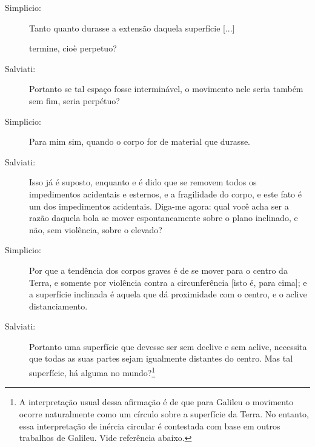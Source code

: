 \begin{description}
\item[Simplicio:] Tanto quanto durasse a extensão daquela superfície [...]

termine, cioè perpetuo?
\item[Salviati:] Portanto se tal espaço fosse interminável, o movimento nele seria também sem fim, seria perpétuo?

\item[Simplicio:] Para mim sim, quando o corpo for de material que durasse.

\item[Salviati:] Isso já é suposto, enquanto e é dido que se removem todos os impedimentos acidentais e esternos, e a fragilidade do corpo, e este fato é um dos impedimentos acidentais. Diga-me agora: qual você acha ser a razão  daquela bola se mover espontaneamente sobre o plano inclinado, e não, sem violência, sobre o elevado?

\item[Simplicio:] Por que a tendência dos corpos graves é de se mover para o centro da Terra, e somente por violência contra a circunferência [isto é, para cima]; e a superfície inclinada é aquela que dá proximidade com o centro, e o aclive distanciamento.

\item[Salviati:] Portanto uma superfície que devesse ser sem declive e sem aclive, necessita que todas as suas partes sejam igualmente distantes do centro. Mas tal superfície, há alguma no mundo?\footnote{A interpretação usual dessa afirmação é de que para Galileu o movimento ocorre naturalmente como um círculo sobre a superfície da Terra. No entanto, essa interpretação de inércia circular é contestada com base em outros trabalhos de Galileu. Vide referência abaixo.}\cite{Vasconcelos2005}


\end{description}
